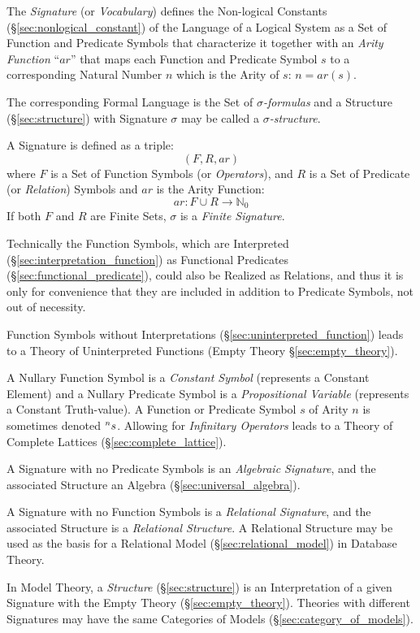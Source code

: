 The \emph{Signature} (or \emph{Vocabulary}) defines the Non-logical
Constants (\S\ref{sec:nonlogical_constant}) of the Language of a
Logical System as a Set of Function and Predicate Symbols that
characterize it together with an \emph{Arity Function} ``$ar$'' that
maps each Function and Predicate Symbol $s$ to a corresponding Natural
Number $n$ which is the Arity of $s$: $n = ar(s)$.

The corresponding Formal Language is the Set of
\emph{$\sigma$-formulas} and a Structure (\S\ref{sec:structure}) with
Signature $\sigma$ may be called a \emph{$\sigma$-structure}.

A Signature is defined as a triple:
\[
  (F,R,ar)
\]
where $F$ is a Set of Function Symbols (or \emph{Operators}), and $R$
is a Set of Predicate (or \emph{Relation}) Symbols and $ar$ is the
Arity Function:
\[
  ar: F \cup R \rightarrow \mathbb{N}_0
\]
If both $F$ and $R$ are Finite Sets, $\sigma$ is a \emph{Finite
  Signature}.

Technically the Function Symbols, which are Interpreted
(\S\ref{sec:interpretation_function}) as Functional Predicates
(\S\ref{sec:functional_predicate}), could also be Realized as
Relations, and thus it is only for convenience that they are included
in addition to Predicate Symbols, not out of necessity.

Function Symbols without Interpretations
(\S\ref{sec:uninterpreted_function}) leads to a Theory of
Uninterpreted Functions (Empty Theory \S\ref{sec:empty_theory}).

A Nullary Function Symbol is a \emph{Constant Symbol} (represents a
Constant Element) and a Nullary Predicate Symbol is a
\emph{Propositional Variable} (represents a Constant Truth-value). A
Function or Predicate Symbol $s$ of Arity $n$ is sometimes denoted
$\prescript{n}{}{s}$. Allowing for \emph{Infinitary Operators} leads
to a Theory of Complete Lattices (\S\ref{sec:complete_lattice}).

A Signature with no Predicate Symbols is an \emph{Algebraic
  Signature}, and the associated Structure an Algebra
(\S\ref{sec:universal_algebra}).

A Signature with no Function Symbols is a \emph{Relational Signature},
and the associated Structure is a \emph{Relational Structure}. A
Relational Structure may be used as the basis for a Relational Model
(\S\ref{sec:relational_model}) in Database Theory.

In Model Theory, a \emph{Structure} (\S\ref{sec:structure}) is an
Interpretation of a given Signature with the Empty Theory
(\S\ref{sec:empty_theory}). Theories with different Signatures may
have the same Categories of Models (\S\ref{sec:category_of_models}).

